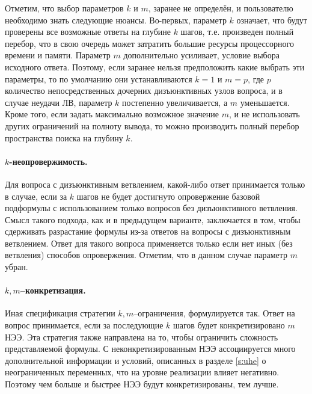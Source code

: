 Отметим, что выбор параметров $k$ и $m$, заранее не определён, и пользователю необходимо знать следующие нюансы. Во-первых, параметр $k$ означает, что будут проверены все возможные ответы на глубине $k$ шагов, т.е. произведен полный перебор, что в свою очередь может затратить большие ресурсы процессорного времени и памяти. Параметр $m$ дополнительно усиливает, условие выбора исходного ответа. Поэтому, если заранее нельзя предположить какие выбрать эти параметры, то по умолчанию они устанавливаются $k=1$ и $m=p$, где $p$ количество непосредственных дочерних дизъюнктивных узлов вопроса, и в случае неудачи ЛВ, параметр $k$ постепенно увеличивается, а $m$ уменьшается. Кроме того, если задать максимально возможное значение $m$, и не использовать других ограничений на полноту вывода, то можно производить полный перебор пространства поиска на глубину $k$.

\paragraph{$k$-неопровержимость.} Для вопроса с дизъюнктивным ветвлением, какой-либо ответ принимается только в случае, если за $k$ шагов не будет достигнуто опровержение базовой подформулы с использованием только вопросов без дизъюнктивного ветвления. Смысл такого подхода, как и в предыдущем варианте, заключается в том, чтобы сдерживать разрастание формулы из-за ответов на вопросы с дизъюнктивным ветвлением. Ответ для такого вопроса применяется только если нет иных (без ветвления) способов опровержения. Отметим, что в данном случае параметр $m$ убран.

\paragraph{$k,m$--конкретизация.} Иная спецификация стратегии $k,m$--ограничения, формулируется так. Ответ на вопрос принимается, если за последующие $k$ шагов будет конкретизировано $m$ НЭЭ. Эта стратегия также направлена на то, чтобы ограничить сложность представляемой формулы. С неконкретизированным НЭЭ ассоциируется много дополнительной информации и условий, описанных в разделе \ref{s:uhe} о неограниченных переменных, что на уровне реализации влияет негативно. Поэтому чем больше и быстрее НЭЭ будут конкретизированы, тем лучше.






